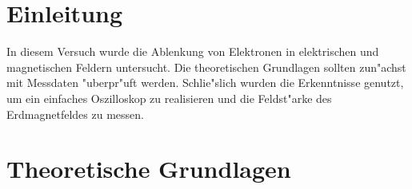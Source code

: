 \section{Einleitung}
	In diesem Versuch wurde die Ablenkung von Elektronen in elektrischen und magnetischen Feldern untersucht.
	Die theoretischen Grundlagen sollten zun"achst mit Messdaten "uberpr"uft werden.
	Schlie"slich wurden die Erkenntnisse genutzt, um ein einfaches Oszilloskop zu realisieren und die Feldst"arke des Erdmagnetfeldes zu messen.

\section{Theoretische Grundlagen}
	
